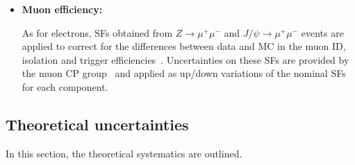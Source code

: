 \begin{itemize}
\item \textbf{Muon efficiency:}

As for electrons, SFs obtained from $Z\rightarrow \mu^{+}\mu^{-}$ and $J/\psi \rightarrow \mu^{+}\mu^{-}$ events are applied to correct for the differences between data and MC in the muon ID,
isolation and trigger efficiencies~\cite{MUON-2018-03}. Uncertainties on these SFs are provided by the muon
CP group~\cite{twiki-muSF} and applied as up/down variations of the nominal SFs for each component.


\end{itemize}

\subsection{Theoretical uncertainties}
\label{subsec:syst_theory}

In this section, the theoretical systematics are outlined.

